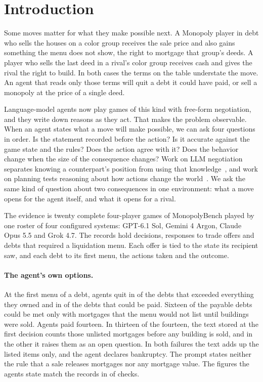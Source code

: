 \section{Introduction}
\label{sec:intro}

Some moves matter for what they make possible next. A Monopoly player in debt who sells the houses on a color group receives the sale price and also gains something the menu does not show, the right to mortgage that group's deeds. A player who sells the last deed in a rival's color group receives cash and gives the rival the right to build. In both cases the terms on the table understate the move. An agent that reads only those terms will quit a debt it could have paid, or sell a monopoly at the price of a single deed.

Language-model agents now play games of this kind with free-form negotiation, and they write down reasons as they act. That makes the problem observable. When an agent states what a move will make possible, we can ask four questions in order. Is the statement recorded before the action? Is it accurate against the game state and the rules? Does the action agree with it? Does the behavior change when the size of the consequence changes? Work on LLM negotiation separates knowing a counterpart's position from using that knowledge~\cite{cosentino2026counterparty}, and work on planning tests reasoning about how actions change the world~\cite{valmeekam2023planbench}. We ask the same kind of question about two consequences in one environment: what a move opens for the agent itself, and what it opens for a rival.

The evidence is twenty complete four-player games of MonopolyBench played by one roster of four configured systems: GPT-6.1 Sol, Gemini 4 Argon, Claude Opus 5.5 and Grok 4.7. The records hold  decisions,  responses to trade offers and  debts that required a liquidation menu. Each offer is tied to the state its recipient saw, and each debt to its first menu, the actions taken and the outcome.

\paragraph{The agent's own options.}
At the first menu of a debt, agents quit in  of the  debts that exceeded everything they owned and in  of the  debts that could be paid. Sixteen of the payable debts could be met only with mortgages that the menu would not list until buildings were sold. Agents paid fourteen. In thirteen of the fourteen, the text stored at the first decision counts those unlisted mortgages before any building is sold, and in the other it raises them as an open question. In both failures the text adds up the listed items only, and the agent declares bankruptcy. The prompt states neither the rule that a sale releases mortgages nor any mortgage value. The figures the agents state match the records in  of  checks.


